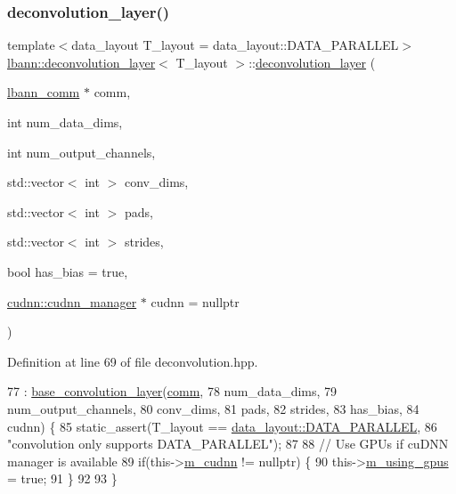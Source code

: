 \subsubsection{\texorpdfstring{deconvolution\+\_\+layer()}{deconvolution\_layer()}\hspace{0.1cm}{\footnotesize\ttfamily [2/2]}}
{\footnotesize\ttfamily template$<$data\+\_\+layout T\+\_\+layout = data\+\_\+layout\+::\+D\+A\+T\+A\+\_\+\+P\+A\+R\+A\+L\+L\+EL$>$ \\
\hyperlink{classlbann_1_1deconvolution__layer}{lbann\+::deconvolution\+\_\+layer}$<$ T\+\_\+layout $>$\+::\hyperlink{classlbann_1_1deconvolution__layer}{deconvolution\+\_\+layer} (\begin{DoxyParamCaption}\item[{\hyperlink{classlbann_1_1lbann__comm}{lbann\+\_\+comm} $\ast$}]{comm,  }\item[{int}]{num\+\_\+data\+\_\+dims,  }\item[{int}]{num\+\_\+output\+\_\+channels,  }\item[{std\+::vector$<$ int $>$}]{conv\+\_\+dims,  }\item[{std\+::vector$<$ int $>$}]{pads,  }\item[{std\+::vector$<$ int $>$}]{strides,  }\item[{bool}]{has\+\_\+bias = {\ttfamily true},  }\item[{\hyperlink{classlbann_1_1cudnn_1_1cudnn__manager}{cudnn\+::cudnn\+\_\+manager} $\ast$}]{cudnn = {\ttfamily nullptr} }\end{DoxyParamCaption})\hspace{0.3cm}{\ttfamily [inline]}}



Definition at line 69 of file deconvolution.\+hpp.


\begin{DoxyCode}
77     : \hyperlink{classlbann_1_1base__convolution__layer_a1489c6034dc88a8749ccd0ae4a3b02a8}{base\_convolution\_layer}(\hyperlink{file__io_8cpp_ab048c6f9fcbcfaa57ce68b00263dbebe}{comm},
78                              num\_data\_dims,
79                              num\_output\_channels,
80                              conv\_dims,
81                              pads,
82                              strides,
83                              has\_bias,
84                              cudnn) \{
85     static\_assert(T\_layout == \hyperlink{base_8hpp_a786677cbfb3f5677b4d84f3056eb08dba37d2a3465f7cbf4ab60f4e79944d0638}{data\_layout::DATA\_PARALLEL},
86                   \textcolor{stringliteral}{"convolution only supports DATA\_PARALLEL"});
87 
88     \textcolor{comment}{// Use GPUs if cuDNN manager is available}
89     \textcolor{keywordflow}{if}(this->\hyperlink{classlbann_1_1Layer_a08dbb94239e3b8c96329786c57c72e21}{m\_cudnn} != \textcolor{keyword}{nullptr}) \{
90       this->\hyperlink{classlbann_1_1Layer_af7881cb5eff5207c15fa835d65462e8f}{m\_using\_gpus} = \textcolor{keyword}{true};
91     \}
92 
93   \}
\end{DoxyCode}


